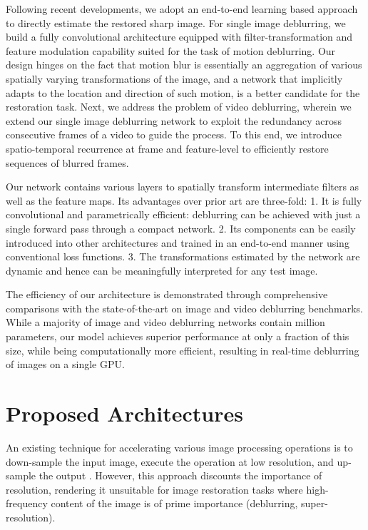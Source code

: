 \documentclass[10pt,twocolumn,letterpaper]{article}
\begin{document}
Following recent developments, we adopt an end-to-end learning based approach to directly estimate the restored sharp image. For single image deblurring, we build a fully convolutional architecture equipped with filter-transformation and feature modulation capability suited for the task of motion deblurring. Our design hinges on the fact that motion blur is essentially an aggregation of various spatially varying transformations of the image, and a network that implicitly adapts to the location and direction of such motion, is a better candidate for the restoration task. Next, we address the problem of video deblurring, wherein we extend our single image deblurring network to exploit the redundancy across consecutive frames of a video to guide the process. To this end, we introduce spatio-temporal recurrence at frame and feature-level to efficiently restore sequences of blurred frames.



Our network contains various layers to spatially transform intermediate filters as well as the feature maps. Its advantages over prior art are three-fold: 1. It is fully convolutional and parametrically efficient: deblurring can be achieved with just a single forward pass through a compact network. 2. Its components can be easily introduced into other architectures and trained in an end-to-end manner using conventional loss functions. 3. The transformations estimated by the network are dynamic and hence can be meaningfully interpreted for any test image. 


The efficiency of our architecture is demonstrated through comprehensive comparisons with the state-of-the-art on image and video deblurring benchmarks. While a majority of image and video deblurring networks contain  million parameters, our model achieves superior performance at only a fraction of this size, while being computationally more efficient, resulting in real-time deblurring of images on a single GPU.\\

\section{Proposed Architectures}

An existing technique for accelerating various image processing operations is to down-sample the input image, execute the operation at low resolution, and up-sample the output \cite{chen2016bilateral}. However, this approach discounts the importance of resolution, rendering it unsuitable for image restoration tasks where high-frequency content of the image is of prime importance (deblurring, super-resolution).
\end{document}
